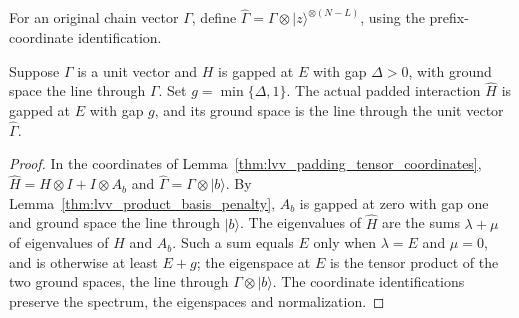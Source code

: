 \begin{definition}
    \label{def:lvv_padded_ground_vector}
    \leanok
    For an original chain vector $\Gamma$, define
    $\widehat\Gamma=\Gamma\otimes|z\rangle^{\otimes(N-L)}$,
    using the prefix-coordinate identification.
\end{definition}

\begin{lemma}
    \label{thm:lvv_padding_ground_gap}
    \leanok
    Suppose $\Gamma$ is a unit vector and $H$ is gapped at $E$ with gap
    $\Delta>0$, with ground space the line through $\Gamma$.
    Set $g=\min\{\Delta,1\}$.
    The actual padded interaction $\widehat H$ is gapped at $E$ with gap $g$,
    and its ground space is the line through the unit vector $\widehat\Gamma$.
\end{lemma}
\begin{proof}
    \leanok
    In the coordinates of Lemma~\ref{thm:lvv_padding_tensor_coordinates},
    $\widehat H=H\otimes I+I\otimes A_b$ and
    $\widehat\Gamma=\Gamma\otimes|b\rangle$. By
    Lemma~\ref{thm:lvv_product_basis_penalty}, $A_b$ is gapped at zero with
    gap one and ground space the line through $|b\rangle$. The eigenvalues of
    $\widehat H$ are the sums $\lambda+\mu$ of eigenvalues of $H$ and $A_b$.
    Such a sum equals $E$ only when $\lambda=E$ and $\mu=0$, and is otherwise
    at least $E+g$; the eigenspace at $E$ is the tensor product of the two
    ground spaces, the line through $\Gamma\otimes|b\rangle$. The coordinate
    identifications preserve the spectrum, the eigenspaces and normalization.
\end{proof}


